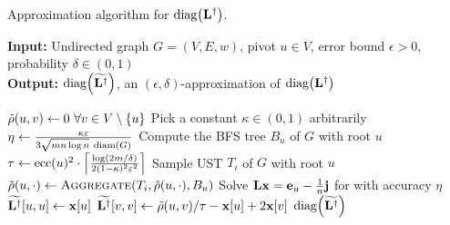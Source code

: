 \begin{algorithm}[t]
\footnotesize
{}
\caption{\footnotesize Approximation algorithm for $\diag{\Linv}$.}
\label{algo:linv-diag-apx}
\textbf{Input:} Undirected graph $G = (V, E, w)$, pivot $u \in V$, error bound $\epsilon > 0$, probability $\delta\in (0, 1)$\\
\textbf{Output:} $\diag{\Linvapx}$, \ie an $(\epsilon, \delta)$-approximation of $\diag{\Linv}$

\begin{algorithmic}[1]
\State$\rdistapx(u, v) \gets 0\ \forall v \in V\setminus\set{u}$\label{line:linv-diag-apx:rdist-init}
\State Pick a constant $\kappa\in(0, 1)$ arbitrarily
\State$\eta \gets \frac{\kappa\varepsilon}{3\sqrt{mn\log n}\ \text{diam}(G)}$\label{line:linv-diag-apx:eta}
\State Compute the BFS tree $B_u$ of $G$ with root $u$
\label{line:linv-diag-apx:bu}
\State$\tau \gets \ecc(u)^2\cdot\ceil{\frac{\log(2m/\delta)}{2(1 - \kappa)^2\epsilon^2}}$
\label{line:linv-diag-apx:tau}
\label{line:linv-diag-apx:for-tau}
\State Sample UST $T_i$ of $G$ with root $u$
\State$\tilde{\rho}(u, \cdot) \gets\textsc{Aggregate}(T_i, \tilde{\rho}(u, \cdot), B_u)$
\EndFor\label{line:linv-diag-apx:end-ust-loop}
\State Solve $\mathbf{L}\mathbf{x} = \mathbf{e}_{u} - \frac{1}{n}\mathbf{j}$ for  with accuracy $\eta$
\label{line:linv-diag-apx:solve}
\State$\widetilde{\mathbf{L}^\dagger}[u, u] \gets \mathbf{x}[u]$
\State$\widetilde{\mathbf{L}^\dagger}[v, v] \gets \tilde{\rho}(u, v)/\tau - \mathbf{x}[u] + 2\mathbf{x}[v]$\label{line:linv-diag-apx:update-linvapx}
\EndFor
\State\Return$\diag{\Linvapx}$
\end{algorithmic}
\end{algorithm}

